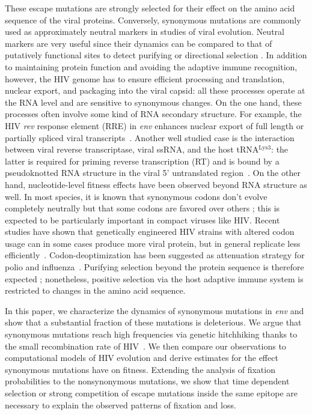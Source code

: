 \documentclass[rmp, twocolumn]{revtex4}
\newcommand{\rev}{\textit{rev}}
\newcommand{\env}{\textit{env}}
\begin{document}
These escape mutations are strongly selected for their effect on the amino acid
sequence of the viral proteins. Conversely, synonymous mutations are commonly
used as approximately neutral markers in studies of viral evolution. Neutral
markers are very useful since their dynamics can be compared to
that of putatively functional sites to detect purifying or directional selection
\citep{Bhatt:2011p43255,Hurst:2002p32608,Chen:2004p22606}.
In addition to maintaining protein function and avoiding the adaptive immune
recognition, however, the HIV genome has to ensure efficient processing and translation,
nuclear export, and packaging into the viral capsid: all these processes operate at the RNA
level and are sensitive to synonymous changes.
On the one hand, these processes often involve some kind of RNA secondary structure.
For example, the HIV \rev{} response element (RRE) in \env{} enhances nuclear export of
full length or partially spliced viral transcripts~\citep{fernandes_hiv-1_2012}.
Another well studied case is the interaction between viral reverse transcriptase, viral ssRNA, and the host
tRNA$^\text{Lys3}$: the latter is required for priming reverse transcription
(RT) and is bound by a pseudoknotted RNA structure in the viral 5'
untranslated region~\citep{barat_interaction_1991, paillart_vitro_2002}.
On the other hand, nucleotide-level fitness effects have been observed beyond RNA structure as
well.
In most species, it is  known that synonymous codons don't evolve completely neutrally
but that some codons are favored over others \citep{plotkin_synonymous_2011};
this is expected to be particularly important in compact viruses like HIV. 
Recent studies have shown that genetically engineered HIV strains with
altered codon usage can in some cases produce more viral protein, but in general
replicate less efficiently~\citep{ngumbela_quantitative_2008,
li_codon-usage-based_2012,keating_rich_2009}.
Codon-deoptimization has been suggested as attenuation strategy for polio and 
influenza~\citep{mueller_live_2010,coleman_virus_2008}. Purifying
selection beyond the protein sequence is therefore expected
\citep{forsdyke_reciprocal_1995,snoeck_mapping_2011}; nonetheless, positive
selection via the host adaptive immune system is restricted to changes in the
amino acid sequence.

In this paper, we characterize the dynamics of synonymous mutations in \env{}
and show that a substantial fraction of these mutations is deleterious.
We argue that synonymous mutations reach high frequencies via genetic hitchhiking
thanks to the small recombination rate of HIV~\citep{neher_recombination_2010,
batorsky_estimate_2011}.
We then
compare our observations to computational models of HIV evolution and derive
estimates for the effect synonymous mutations have on fitness.
Extending the analysis of fixation probabilities to the
nonsynonymous mutations, we show that time dependent selection or strong
competition of escape mutations inside the same epitope are necessary to explain
the observed patterns of fixation and loss.
\end{document}
